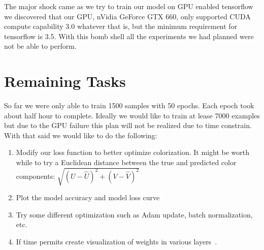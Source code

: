 \documentclass[12pt]{article}
\begin{document}
The major shock came as we try to train our model on GPU enabled tensorflow we discovered that our GPU, nVidia GeForce GTX 660, only supported CUDA compute capability 3.0 whatever that is, but the minimum requirement for tensorflow is 3.5. With this bomb shell all the experiments we had planned were not be able to perform. 


\section{Remaining Tasks}
So far we were only able to train 1500 samples with 50 epochs. Each epoch took about half hour to complete. Ideally we would like to train at lease 7000 examples but due to the GPU failure this plan will not be realized due to time constrain. With that said we would like to do the following:

\begin{enumerate}[label=(\roman*)]
\item Modify our loss function to better optimize colorization. It might be worth while to try a Euclidean distance between the true and predicted color components: $\sqrt{(U-\hat{U})^2+(V-\hat{V})^2}$
\item Plot the model accuracy and model loss curve
\item Try some different optimization such as Adam update, batch normalization, etc. 
\item If time permits create visualization of weights in various layers~\cite{VISW}.
\end{enumerate}



\end{document}
